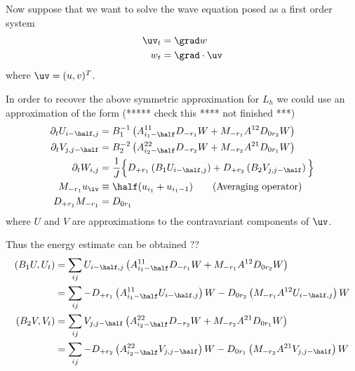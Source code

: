 \documentclass[10pt]{article}
\begin{document}
Now suppose that we want to solve the wave equation posed as a first order system
\begin{align*}
  \uv_t &= \grad w \\
  w_t &= \grad\cdot \uv
\end{align*}
where $\uv=(u,v)^T$.

In order to recover the above symmetric approximation for $L_h$ we could use an approximation of
the form (***** check this **** not finished ***)
\begin{align*}
  \partial_t U_{i\mh,j} &= B_1^{-1}\left( A^{11}_{i_1-\half}D_{- r_1}W +  M_{- r_1} A^{12} D_{0 r_2}W\right) \\
  \partial_t V_{j,j\mh} &= B_2^{-2}\left( A^{22}_{i_2-\half}D_{- r_2}W +  M_{- r_2} A^{21} D_{0 r_1}W \right)\\
  \partial_t W_{i,j} &= {1\over J} \Big\lbrace
        D_{+ r_1}\left( B_1 U_{i\mh,j} \right) +
        D_{+ r_2}\left( B_2 V_{j,j\mh} \right) \Big\rbrace \\
  M_{- r_1} u_\iv &\equiv \half( u_{i_1} + u_{i_1-1} ) \qquad \mbox{(Averaging operator)}\\
  D_{+ r_1}M_{- r_1} &= D_{0 r_1} 
\end{align*}
where $U$ and $V$ are approximations to the contravariant components of $\uv$.

Thus the energy estimate can be obtained ??
\begin{align*}
  (B_1 U, U_t) &= 
    \sum_{ij}   U_{i\mh,j} \left( A^{11}_{i_1-\half}D_{- r_1}W +  M_{- r_1} A^{12} D_{0 r_2}W\right) \\
    &= \sum_{ij}   -D_{+r_1} \left( A^{11}_{i_1-\half} U_{i\mh,j} \right) W
                   -D_{0 r_2}\left( M_{- r_1} A^{12} U_{i\mh,j}\right) W \\
  (B_2 V, V_t) &= 
       \sum_{ij} V_{j,j\mh} \left( A^{22}_{i_2-\half}D_{- r_2}W +  M_{- r_2} A^{21} D_{0 r_1}W \right) \\
    &= \sum_{ij} -D_{+ r_2}\left( A^{22}_{i_2-\half} V_{j,j\mh} \right) W
                 -D_{0 r_1}\left(M_{- r_2} A^{21} V_{j,j\mh} \right) W
\end{align*}
\end{document}
